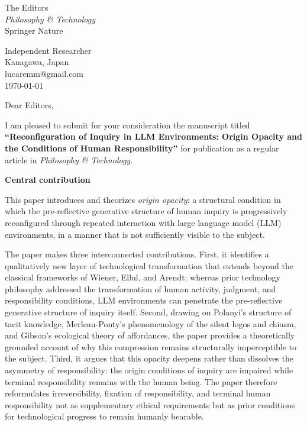 \documentclass[12pt]{article}
\begin{document}
\thispagestyle{empty}

\noindent
The Editors\\
\textit{Philosophy \& Technology}\\
Springer Nature

\bigskip
\noindent
Independent Researcher\\
Kanagawa, Japan\\
lucaremm@gmail.com\\
\today

\bigskip

\noindent Dear Editors,

\bigskip

I am pleased to submit for your consideration the manuscript titled \textbf{``Reconfiguration of Inquiry in LLM Environments: Origin Opacity and the Conditions of Human Responsibility''} for publication as a regular article in \textit{Philosophy \& Technology}.

\bigskip

\noindent\textbf{Central contribution}

This paper introduces and theorizes \textit{origin opacity}: a structural condition in which the pre-reflective generative structure of human inquiry is progressively reconfigured through repeated interaction with large language model (LLM) environments, in a manner that is not sufficiently visible to the subject.

The paper makes three interconnected contributions. First, it identifies a qualitatively new layer of technological transformation that extends beyond the classical frameworks of Wiener, Ellul, and Arendt: whereas prior technology philosophy addressed the transformation of human activity, judgment, and responsibility conditions, LLM environments can penetrate the pre-reflective generative structure of inquiry itself. Second, drawing on Polanyi's structure of tacit knowledge, Merleau-Ponty's phenomenology of the silent logos and chiasm, and Gibson's ecological theory of affordances, the paper provides a theoretically grounded account of why this compression remains structurally imperceptible to the subject. Third, it argues that this opacity deepens rather than dissolves the asymmetry of responsibility: the origin conditions of inquiry are impaired while terminal responsibility remains with the human being. The paper therefore reformulates irreversibility, fixation of responsibility, and terminal human responsibility not as supplementary ethical requirements but as prior conditions for technological progress to remain humanly bearable.
\end{document}
